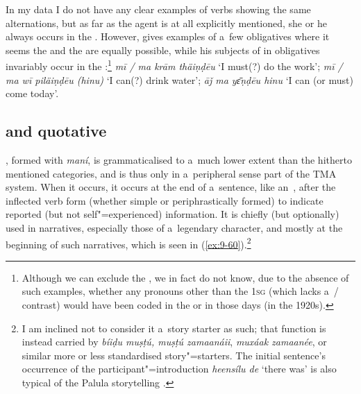 In my data I do not have any clear examples of  verbs showing the same alternations, but as far as the agent is at all explicitly mentioned, she or he always occurs in the . However, \citet[24]{morgenstierne1941} gives examples of a~few  obligatives where it seems the  and the  are equally possible, while his subjects of in obligatives invariably occur in the :\footnote{Although we can exclude the , we in fact do not know, due to the absence of such examples, whether any pronouns other than the \textsc{1sg} (which lacks a~/ contrast) would have been coded in the  or  in those days (in the 1920s).} \textit{mī / ma krām thäiṇḍēu} `I must(?) do the work'; \textit{mī / ma wī piläiṇḍēu (hinu)} `I can(?) drink water'; \textit{āǰ ma yɛ̄ṇḍēu hinu} `I can (or must) come today'.


\subsection{ and quotative}
\label{subsec:9-2-4}

, formed with \textit{maní}, is grammaticalised to a~much lower extent than the hitherto mentioned categories, and is thus only in a~peripheral sense part of the TMA system. When it occurs, it occurs at the end of a~sentence, like an~, after the inflected  verb form (whether simple or periphrastically formed) to indicate reported (but not self"=experienced) information. It is chiefly (but optionally) used in narratives, especially those of a~legendary character, and mostly at the beginning of such narratives, which is seen in (\ref{ex:9-60}).\footnote{I am inclined not to consider it a~story starter as such; that function is instead carried by \textit{bíiḍu muṣṭú, muṣṭú zamaanáii}, \textit{muxáak zamaanée}, or similar more or less standardised story"=starters. The initial sentence's occurrence of the participant"=introduction \textit{heensílu de} `there was' is also typical of the Palula storytelling .} 

